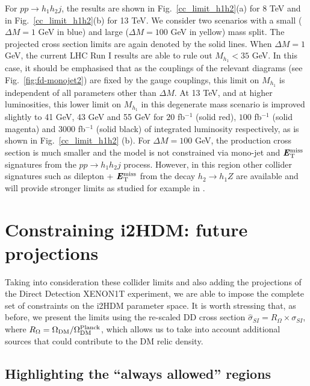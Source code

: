 \documentclass[12pt,a4paper]{article}
\newcommand{\MET}{\textbf{\textit{E}$_{\rm T}^{\rm miss}$}}
\begin{document}
For $pp\rightarrow h_1h_2 j$, the results are shown in Fig.~\ref{cc_limit_h1h2}(a) for 8 TeV and in Fig.~\ref{cc_limit_h1h2}(b) for 13 TeV. We consider two scenarios with a small ($\Delta M =1$ GeV in blue) and large ($\Delta M =100$ GeV in yellow) mass split. The projected cross section limits are again denoted by the solid lines. When $\Delta M = 1$ GeV, the current LHC Run I results are able to rule out $M_{h_1} < 35$ GeV. In this case, it should be emphasised that as the couplings of the relevant diagrams (see Fig.~\ref{fig:fd-monojet2}) are fixed by the gauge couplings, this limit on $M_{h_1}$ is independent of all parameters other than $\Delta M$. At 13 TeV, and at higher luminosities, this lower limit on $M_{h_1}$ in this degenerate mass scenario is improved slightly to 41 GeV, 43 GeV and 55 GeV for $20$ fb$^{-1}$ (solid red), $100$ fb$^{-1}$ (solid magenta) and $3000$ fb$^{-1}$ (solid black) of integrated luminosity respectively, as is shown in Fig.~\ref{cc_limit_h1h2} (b). For $\Delta M = 100$ GeV, the production cross section is much smaller and the model is not constrained via mono-jet and $\MET{}$ signatures from the $pp\rightarrow h_1h_2 j$ process. However, in this region other collider signatures such as dilepton + $\MET{}$ from the decay $h_2 \to h_1Z$ are available and will provide stronger limits as studied for example in \cite{Belanger:2015kga}.


%
%
\section{Constraining i2HDM: future projections}

Taking into consideration these collider limits and also adding the projections of the Direct Detection XENON1T experiment,
we are able to impose the complete set of constraints on the i2HDM parameter space. 
It is worth stressing that, as before, we  present the limits using  the re-scaled DD cross section 
$\hat{\sigma}_{SI}= R_\Omega\times \sigma_{SI}$, where $R_\Omega = \Omega_{\rm DM}/\Omega^{\rm Planck}_{\rm DM}$, which allows us to take into account additional sources that could contribute to the DM relic density. 

\subsection{Highlighting the ``always allowed'' regions}
\end{document}

